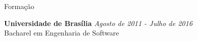 \documentclass{resume} %
\begin{document}





\begin{rSection}{Formação}

{\bf Universidade de Brasília} \hfill {\em Agosto de 2011 - Julho de 2016} \\ 
Bacharel em Engenharia de Software \\

\end{rSection}

\end{document}
